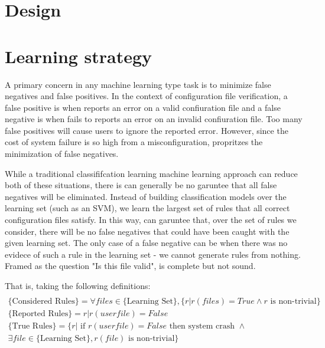 
\section{\app Design}


\section{Learning strategy}

A primary concern in any machine learning type task is to minimize false negatives and false positives.
In the context of configuration file verification,
  a false positive is when \app reports an error on a valid confiuration file and
  a false negative is when \app fails to reports an error on an invalid confiuration file.
Too many false positives will cause users to ignore the reported error\cite{}.
However, since the cost of system failure is so high from a misconfiguration, \app propritzes the minimization of false negatives.

While a traditional classififcation learning machine learning approach can reduce both of these situations, there is can generally be no garuntee that all false negatives will be eliminated.
Instead of building classification models over the learning set (such as an SVM), we learn the largest set of rules that all correct configuration files satisfy.
In this way, \app can garuntee that, over the set of rules we consider, there will be no false negatives that could have been caught with the given learning set.
The only case of a false negative can be when there was no evidece of such a rule in the learning set - we cannot generate rules from nothing.
Framed as the question "Is this file valid", \app is complete but not sound. 

That is, taking the following definitions:
\begin{multline*}\\
\text{\{Considered Rules\}} = \forall files \in \text{\{Learning Set\}}, \{ r | r(files) = True \land r \text{ is non-trivial}\}\\
\text{\{Reported Rules\}} = {r | r(userfile)=False } \\
\text{\{True Rules\}} = \{r | \text{ if } r(userfile)=False \text{ then system crash } \land \\
   \exists file \in \text{\{Learning Set\}}, r(file) \text{ is non-trivial}\}
\end{multline*}

